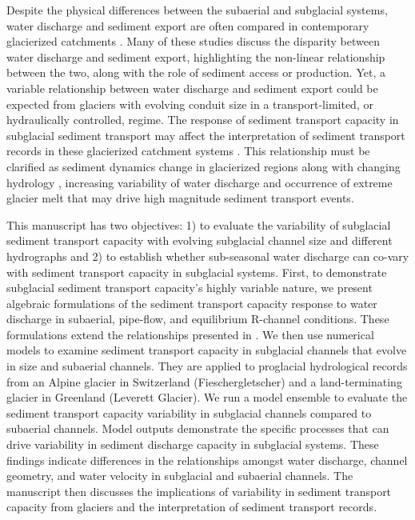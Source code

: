 \documentclass[esurf, manuscript]{copernicus}
\begin{document}
Despite the physical differences between the subaerial and subglacial systems, water discharge and sediment export are often compared in contemporary glacierized catchments \citep[e.g.][]{willis1996,pearce2003,richards2003,swift2005,chu2009,tedstone2012,chu2012,overeem2017,delaney2018,swift2021,lu2022,andresen2024}.
Many of these studies discuss the disparity between water discharge and sediment export, highlighting the non-linear relationship between the two, along with the role of sediment access or production.
Yet, a variable relationship between water discharge and sediment export could be expected from glaciers with evolving conduit size in a transport-limited, or hydraulically controlled, regime.
The response of sediment transport capacity in subglacial sediment transport may affect the interpretation of sediment transport records in these glacierized catchment systems \citep[e.g.][]{ganti2016,mancini2023}.
This relationship must be clarified as sediment dynamics change in glacierized regions along with changing hydrology \citep[e.g.][]{brunner2019}, increasing variability of water discharge \citep{lane2019} and occurrence of extreme glacier melt  \citep[e.g.][]{overeem2015,cremona2023} that may drive high magnitude sediment transport events.

This manuscript has two objectives: 1) to evaluate the variability of subglacial sediment transport capacity with evolving subglacial channel size and different hydrographs and 2) to establish whether sub-seasonal water discharge can co-vary with sediment transport capacity in subglacial systems.
First, to demonstrate subglacial sediment transport capacity's highly variable nature,  we present algebraic formulations of the sediment transport capacity response to water discharge in subaerial, pipe-flow, and equilibrium R-channel conditions.
These formulations extend the relationships presented in \citet{alley1997}.
We then use numerical models to examine sediment transport capacity in subglacial channels that evolve in size and subaerial channels.
They are applied to proglacial hydrological records from an Alpine glacier in Switzerland (Fieschergletscher) and a land-terminating glacier in Greenland (Leverett Glacier).
We run a model ensemble to evaluate the sediment transport capacity variability in subglacial channels compared to subaerial channels.
Model outputs demonstrate the specific processes that can drive variability in sediment discharge capacity in subglacial systems.
These findings indicate differences in the relationships amongst water discharge, channel geometry, and water velocity in subglacial and subaerial channels.
The manuscript then discusses the implications of variability in sediment transport capacity from glaciers and the interpretation of sediment transport records.
\end{document}
